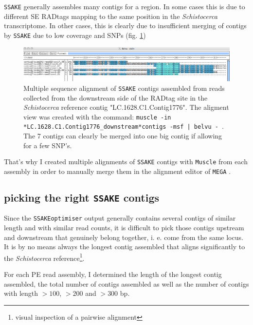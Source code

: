 \documentclass[a4paper,12pt,times,print,index, custombib]{PhDThesisPSnPDF}\usepackage[]{graphicx}\usepackage[]{color}
\begin{document}
\texttt{SSAKE} generally assembles many contigs for a region. In some cases this is due to different SE RADtags mapping to the same position in the \textit{Schistocerca} transcriptome. In other cases, this is clearly due to insufficient merging of contigs by \texttt{SSAKE} due to low coverage and SNPs (fig. \ref{contig_alignment})

\begin{figure}
\centering
\includegraphics[width=\textwidth]{contig_alignment}
\caption{Multiple sequence alignment of \texttt{SSAKE} contigs assembled from reads collected from the downstream side of the RADtag site in the \textit{Schistocerca} reference contig "LC.1628.C1.Contig1776". The aligment view was created with the command: \texttt{muscle -in *LC.1628.C1.Contig1776\_downstream*contigs -msf | belvu -}~. The 7 contigs can clearly be merged into one big contig if allowing for a few SNP's.}
\label{contig_alignment}
\end{figure}

That's why I created multiple alignments of \texttt{SSAKE} contigs with \texttt{Muscle} \citep{Edgar2004} from each assembly in order to manually merge them in the alignment editor of \texttt{MEGA} \citep{Tamura2013}.


\FloatBarrier
\subsection{picking the right \texttt{SSAKE} contigs}\label{ch:picking_right_contig}

Since the \texttt{SSAKEoptimiser} output generally contains several \glspl{contig} of similar length and with similar read counts, it is difficult to pick those contigs upstream and downstream that genuinely belong together, i. e. come from the same locus. It is by no means always the longest \gls{contig} assembled that aligns significantly to the \textit{Schistocerca} reference\footnote{visual inspection of a pairwise alignment}.

For each PE read assembly, I determined the length of the longest contig assembled, the total number of contigs assembled as well as the number of contigs with length $>100$, $>200$ and $>300$ \gls{bp}.
\end{document}
